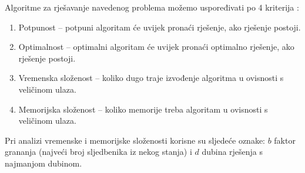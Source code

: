 Algoritme za rješavanje navedenog problema možemo uspoređivati po 4 kriterija \cite{russelNorvig2003:aima}:

\begin{enumerate}
	\item Potpunost -- potpuni algoritam će uvijek pronaći rješenje, ako rješenje postoji.
	\item Optimalnost -- optimalni algoritam će uvijek pronaći optimalno rješenje, ako rješenje postoji.
	\item Vremenska složenost -- koliko dugo traje izvođenje algoritma u ovisnosti s veličinom ulaza.
	\item Memorijska složenost -- koliko memorije treba algoritam u ovisnosti s veličinom ulaza.
\end{enumerate}

Pri analizi vremenske i memorijske složenosti korisne su sljedeće oznake: \( b \) faktor grananja (najveći broj sljedbenika iz nekog stanja) i \( d \) dubina rješenja s najmanjom dubinom.